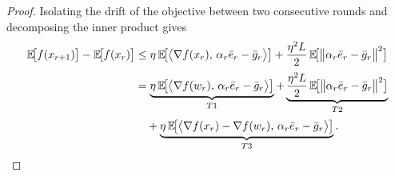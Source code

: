 \documentclass{article} %
\begin{document}
\begin{proof}
Isolating the drift of the objective between two consecutive rounds and
decomposing the inner product gives
\begin{align}\label{eq:descent_decomp}
   \mathbb{E}\!\bigl[f(x_{r+1})\bigr]
   - \mathbb{E}\!\bigl[f(x_r)\bigr]
   &\le
      \eta\,\mathbb{E}\!\bigl[
        \bigl\langle\nabla f(x_r),\,\alpha_r\bar e_r-\bar g_r\bigr\rangle
      \bigr]
      + \frac{\eta^{2}L}{2}\,
        \mathbb{E}\!\bigl[
          \bigl\|\alpha_r\bar e_r-\bar g_r\bigr\|^{2}
        \bigr]                                         \notag   \\[2pt]
   &=
      \underbrace{\eta\,\mathbb{E}\!\bigl[
        \bigl\langle\nabla f(w_r),\,\alpha_r\bar e_r-\bar g_r\bigr\rangle
      \bigr]}_{T1} 
      + \underbrace{\frac{\eta^{2}L}{2}\,
        \mathbb{E}\!\bigl[
          \bigl\|\alpha_r\bar e_r-\bar g_r\bigr\|^{2}
        \bigr]}_{T2}                                        \notag     \\[2pt]
   &\quad
      + \underbrace{\eta\,\mathbb{E}\!\bigl[
        \bigl\langle
          \nabla f(x_r)-\nabla f(w_r),\,\alpha_r\bar e_r-\bar g_r
        \bigr\rangle
      \bigr]}_{T3}.
\end{align}

\end{proof}
\end{document}

